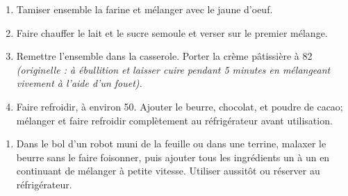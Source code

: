 
\begin{ingredients}
\end{ingredients}


\begin{recipe}
  \begin{enumerate}

  \item Tamiser ensemble la farine et mélanger avec le jaune d’oeuf.

  \item Faire chauffer le lait et le sucre semoule et verser sur le
    premier mélange.

  \item Remettre l’ensemble dans la casserole.  Porter la crème
    pâtissière à 82\degreeC{} \textit{(originelle : à ébullition et laisser cuire pendant 5 minutes en
      mélangeant vivement à l’aide d’un fouet).}

  \item Faire refroidir, à environ 50\degreeC. Ajouter le beurre, chocolat,
    et poudre de cacao; mélanger et faire refroidir complètement au
    réfrigérateur avant utilisation.

  \end{enumerate}
\end{recipe}


\begin{ingredients}
\end{ingredients}


\begin{recipe}
  \begin{enumerate}

  \item Dans le bol d’un robot muni de la feuille ou dans une terrine,
    malaxer le beurre sans le faire foisonner, puis ajouter tous les
    ingrédients un à un en continuant de mélanger à petite vitesse.
    Utiliser aussitôt ou réserver au réfrigérateur.

  \end{enumerate}
\end{recipe}

